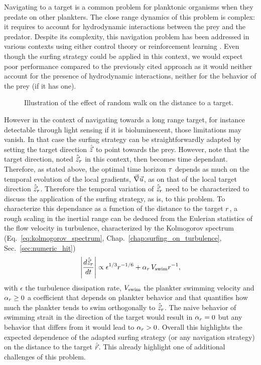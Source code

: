 Navigating to a target is a common problem for planktonic organisms when they predate on other plankters.
The close range dynamics of this problem is complex: it requires to account for hydrodynamic interactions between the prey and the predator.
Despite its complexity, this navigation problem has been addressed in various contexts using either control theory \citep{zhu2022optimising} or reinforcement learning \citep{zhu2022optimising, borra2022reinforcement}.
Even though the surfing strategy could be applied in this context, we would expect poor performance compared to the previously cited approach as it would neither account for the presence of hydrodynamic interactions, neither for the behavior of the prey (if it has one).

\begin{wrapfigure}{R}{0.3\textwidth}
	\centering
	\vspace{10pt}
	\def\svgwidth{0.3\textwidth}
	
  	\caption{Illustration of the effect of random walk on the distance to a target.}
  	\label{fig:distance_target}
\end{wrapfigure}
However in the context of navigating towards a long range target, for instance detectable through light sensing if it is bioluminescent, those limitations may vanish.
In that case the surfing strategy can be straightforwardly adapted by setting the target direction $\Direction$ to point towards the prey.
However, note that the target direction, noted $\Direction_r$ in this context, then becomes time dependant.
Therefore, as stated above, the optimal time horizon $\TimeHorizon$ depends as much on the temporal evolution of the local gradients, $\Gradients$, as on that of the local target direction $\Direction_r$.
Therefore the temporal variation of $\Direction_r$ need to be characterized to discuss the application of the surfing strategy, as is, to this problem.
To characterize this dependance as a function of the distance to the target $\TargetDistance$, a rough scaling in the inertial range can be deduced from the Eulerian statistics of the flow velocity in turbulence, characterized by the Kolmogorov spectrum (Eq.~\ref{eq:kolmogorov_spectrum}, Chap.~\ref{chap:surfing_on_turbulence}, Sec.~\ref{sec:numeric_hit})
\begin{equation}
	\norm*{\frac{d \Direction_r}{dt}} \propto \epsilon^{1/3} r^{-1/6} + \alpha_\TargetDistance \, \SwimmingVelocity r^{-1},
\end{equation}
with $\epsilon$ the turbulence dissipation rate, $\SwimmingVelocity$ the plankter swimming velocity and $\alpha_\TargetDistance \ge 0$ a coefficient that depends on plankter behavior and that quantifies how much the plankter tends to swim orthogonally to $\Direction_r$.
The naive behavior of swimming strait in the direction of the target would result in $\alpha_\TargetDistance = 0$ but any behavior that differs from it would lead to $\alpha_\TargetDistance > 0$.
Overall this highlights the expected dependence of the adapted surfing strategy (or any navigation strategy) on the distance to the target $\TargetDirection$.
This already highlight one of additional challenges of this problem.

